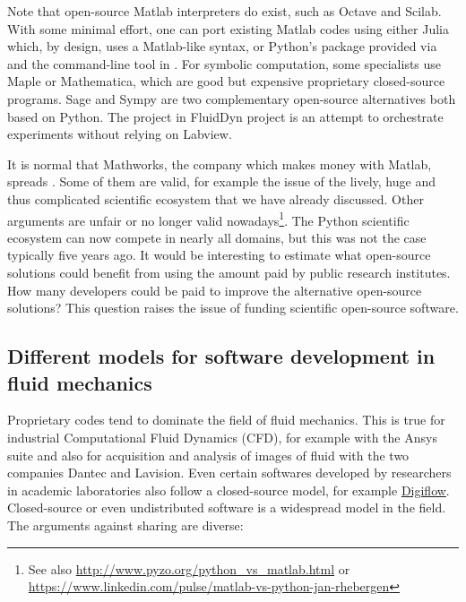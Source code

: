 Note that open-source Matlab interpreters do exist, such as Octave and Scilab.
%
With some minimal effort, one can port existing Matlab codes using either
Julia which, by design, uses a Matlab-like syntax, or Python's 
package provided via  and the command-line tool
 in .
%
For symbolic computation, some specialists use Maple or Mathematica, which are
good but expensive proprietary closed-source programs.
%
Sage and Sympy are two complementary open-source alternatives both based on
Python.
%
The  project in FluidDyn project is an attempt to orchestrate
experiments without relying on Labview.

It is normal that Mathworks, the company which makes money with Matlab, spreads
.  Some of them are valid, for
example the issue of the lively, huge and thus complicated scientific ecosystem
that we have already discussed. Other arguments are unfair or no longer valid
nowadays\footnote{See also \url{http://www.pyzo.org/python\_vs\_matlab.html} or
\url{https://www.linkedin.com/pulse/matlab-vs-python-jan-rhebergen}}.
%
The Python scientific ecosystem can now compete in nearly all domains, but this
was not the case typically five years ago.
%
It would be interesting to estimate what open-source solutions could benefit
from using the amount paid by public research institutes. How many
developers could be paid to improve the alternative open-source solutions?
%
This question raises the issue of funding scientific open-source software.

\subsection{Different models for software development in fluid mechanics}

Proprietary codes tend to dominate the field of fluid mechanics. This is true
for industrial Computational Fluid Dynamics (CFD), for example with the Ansys
suite and also for acquisition and analysis of images of fluid with the
two companies Dantec and Lavision.
%
Even certain softwares developed by researchers in academic laboratories
also follow a closed-source model, for example
\href{http://www.damtp.cam.ac.uk/user/fdl/digiflow/index.htm}{Digiflow}.
%
Closed-source or even undistributed software is a widespread model in the
field.
%
The arguments against sharing are diverse:

